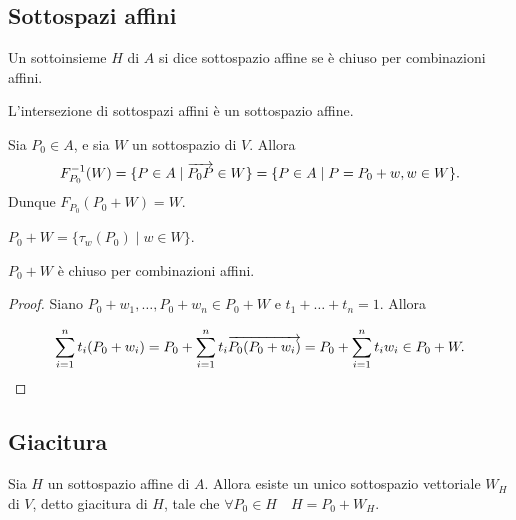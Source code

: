 	\subsection{Sottospazi affini}
 
 Un sottoinsieme $H$ di $A$ si dice sottospazio affine se è chiuso per combinazioni affini.
 
 \vspace{0.5cm}
 
 \begin{remark}
 L'intersezione di sottospazi affini è un sottospazio affine.
 \end{remark}
 
 \vspace{0.5cm}
 
 \begin{example}
 Sia $P_0\in A$, e sia $W$ un sottospazio di $V.$ Allora
 $$F^{-1}_{P_0}(W)=\{P\in A\;|\;\overrightarrow{P_0P}\in W\}=\{P\in A\;|\;P=P_0+w, w\in W\}.$$
 Dunque $F_{P_0}(P_0+W)=W$.
 \end{example}
 
 \vspace{0.5cm}
 
 \begin{remark}
 $P_0+W=\{\tau_w(P_0)\;|\;w\in W\}$.
 \end{remark}
 
 \vspace{0.5cm}
 
 \begin{proposition}
 $P_0+W$ è chiuso per combinazioni affini.
 \end{proposition}
 
 \begin{proof}
 Siano $P_0+w_1,\dots,P_0+w_n\in P_0+W$ e $t_1+\ldots+t_n=1$. Allora
 
 \[
	\sum_{i=1}^nt_i(P_0+w_i)=P_0+\sum_{i=1}^nt_i\overrightarrow{P_0(P_0+w_i)}=P_0+\sum_{i=1}^nt_iw_i\in P_0+W.
 \]
 \end{proof}
 
 \subsection{Giacitura}
 
 \begin{proposition}
 Sia $H$ un sottospazio affine di $A$. Allora esiste un unico sottospazio vettoriale
 $W_H$ di $V$,  detto giacitura di $H$, tale che $\forall P_0\in H\quad H=P_0+W_H$.
 \end{proposition}
 
